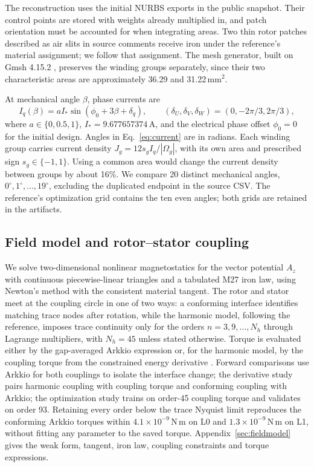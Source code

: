 \documentclass{anvil-paper}
\begin{document}
The reconstruction uses the initial NURBS exports in the public snapshot.
Their control points are stored with weights already multiplied in, and
patch orientation must be accounted for when integrating areas. Two thin
rotor patches described as air slits in source comments receive iron under
the reference's material assignment; we follow that assignment. The
mesh generator, built on Gmsh 4.15.2 \citep{geuzaine2009gmsh}, preserves the winding groups
separately, since their two characteristic areas are approximately 36.29
and 31.22\,mm$^2$.

At mechanical angle $\beta$, phase currents are
\begin{equation}
 I_q(\beta)=a I_*\sin(\phi_0+3\beta+\delta_q),\qquad
 (\delta_U,\delta_V,\delta_W)=(0,-2\pi/3,2\pi/3),
 \label{eq:current}
\end{equation}
where $a\in\{0,0.5,1\}$, $I_*=9.677657374$\,A, and the electrical phase
offset $\phi_0=0$ for the initial design. Angles in
Eq.~\eqref{eq:current} are in radians. Each winding group carries current
density $J_g=12s_g I_q/|\Omega_g|$, with its own area and prescribed sign
$s_g\in\{-1,1\}$. Using a common area would change the current density
between groups by about 16\%. We compare 20 distinct mechanical angles,
$0^\circ,1^\circ,\ldots,19^\circ$, excluding the duplicated endpoint in
the source CSV. The reference's optimization grid contains the ten even
angles; both grids are retained in the artifacts.

\subsection{Field model and rotor--stator coupling}
We solve two-dimensional nonlinear magnetostatics for the vector potential
$A_z$ with continuous piecewise-linear triangles and a tabulated M27 iron
law, using Newton's method with the consistent material tangent. The rotor
and stator meet at the coupling circle in one of two ways: a conforming
interface identifies matching trace nodes after rotation, while the
harmonic model, following the reference, imposes trace continuity only for
the orders $n=3,9,\ldots,N_h$ through Lagrange multipliers, with
$N_h=45$ unless stated otherwise. Torque is evaluated either by the
gap-averaged Arkkio expression \citep{arkkio1987} or, for the harmonic
model, by the coupling torque from the constrained energy derivative
\citep{egger2022torque}. Forward comparisons use Arkkio for both couplings
to isolate the interface change; the derivative study pairs harmonic
coupling with coupling torque and conforming coupling with Arkkio; the
optimization study trains on order-45 coupling torque and validates on
order 93. Retaining every order below the trace Nyquist limit reproduces
the conforming Arkkio torques within $4.1\times10^{-9}$\,N\,m on L0 and
$1.3\times10^{-9}$\,N\,m on L1, without fitting any parameter to the saved
torque. Appendix~\ref{sec:fieldmodel} gives the weak form, tangent, iron
law, coupling constraints and torque expressions.
\end{document}
